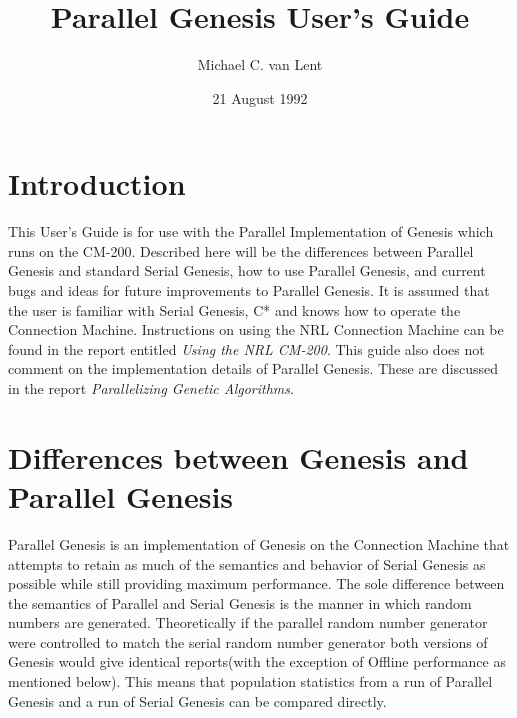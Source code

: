 \textwidth=6.0in
\textheight=9.5in
\hoffset=-0.5in
\voffset=-1.0in
\parskip=0.1in
\raggedright


\title{Parallel Genesis User's Guide}
\author{Michael C. van Lent}
\date{21 August 1992}

\maketitle

\section{Introduction}

This User's Guide is for use with the Parallel Implementation of Genesis which
runs on the CM-200.  Described here will be the differences between Parallel
Genesis and standard Serial Genesis, how to use Parallel Genesis, and current
bugs and ideas for future improvements to Parallel Genesis.  It is assumed
that the user is familiar with Serial Genesis, C* and knows how to operate 
the Connection
Machine.  Instructions on using the NRL Connection Machine can be found in
the report entitled {\it Using the NRL CM-200}.  This guide also does not
comment on the implementation details of Parallel Genesis.  These are discussed
in the report {\it Parallelizing Genetic Algorithms}.

\section{Differences between Genesis and Parallel Genesis}

Parallel Genesis is an implementation of Genesis on the Connection Machine that
attempts to retain as much of the semantics and behavior of Serial Genesis as
possible while still providing maximum performance.  The sole difference 
between the semantics of Parallel and Serial Genesis is the manner in which 
random numbers are generated.  Theoretically if the parallel random number
generator were controlled to match the serial random number generator both
versions of Genesis would give identical reports(with the exception of 
Offline performance as mentioned below).  
This means that population statistics from a run of Parallel Genesis
and a run of Serial Genesis can be compared directly.

